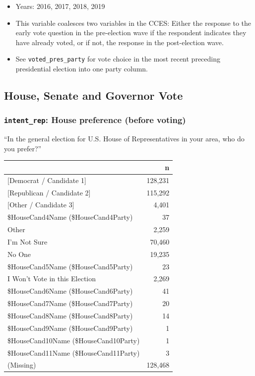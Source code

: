 \documentclass[10pt,article,oneside]{memoir}
\theoremstyle{definition}
\begin{document}
\begin{itemize}
\tightlist
\item
  Years: 2016, 2017, 2018, 2019
\item
  This variable coalesces two variables in the CCES: Either the response
  to the early vote question in the pre-election wave if the respondent
  indicates they have already voted, or if not, the response in the
  post-election wave.
\item
  See \texttt{voted\_pres\_party} for vote choice in the most recent
  preceding presidential election into one party column.
\end{itemize}

\hypertarget{house-senate-and-governor-vote}{%
\subsection{House, Senate and Governor
Vote}\label{house-senate-and-governor-vote}}

\hypertarget{intent_rep-house-preference-before-voting}{%
\subsubsection{\texorpdfstring{\texttt{intent\_rep}: House preference
(before
voting)}{intent\_rep: House preference (before voting)}}\label{intent_rep-house-preference-before-voting}}

``In the general election for U.S. House of Representatives in your
area, who do you prefer?''

\begin{table}[H]
\centering
\begin{tabular}{lr}
\toprule
 & n\\
\midrule
{[Democrat / Candidate 1]} & 128,231\\
{[Republican / Candidate 2]} & 115,292\\
{[Other / Candidate 3]} & 4,401\\
\$HouseCand4Name (\$HouseCand4Party) & 37\\
Other & 2,259\\
I'm Not Sure & 70,460\\
No One & 19,235\\
\$HouseCand5Name (\$HouseCand5Party) & 23\\
I Won't Vote in this Election & 2,269\\
\$HouseCand6Name (\$HouseCand6Party) & 41\\
\$HouseCand7Name (\$HouseCand7Party) & 20\\
\$HouseCand8Name (\$HouseCand8Party) & 14\\
\$HouseCand9Name (\$HouseCand9Party) & 1\\
\$HouseCand10Name (\$HouseCand10Party) & 1\\
\$HouseCand11Name (\$HouseCand11Party) & 3\\
(Missing) & 128,468\\
\bottomrule
\end{tabular}
\end{table}
\end{document}
